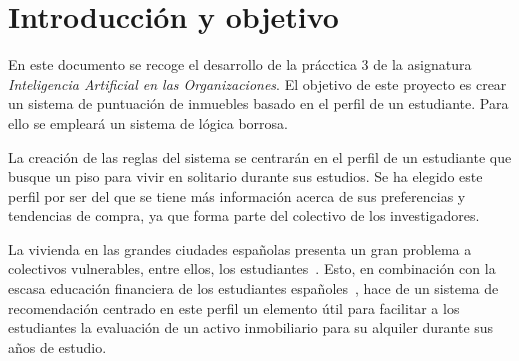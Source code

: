 \documentclass[12pt]{report} %
\begin{document}
\newpage %
\thispagestyle{empty}
\mbox{}


\tableofcontents
\thispagestyle{fancy}

\newpage %
\thispagestyle{empty}
\mbox{}

 \listoffigures
 \thispagestyle{fancy}

 \newpage %
 \thispagestyle{empty}
 \mbox{}

\listoftables
 \thispagestyle{fancy}

 \newpage %
 \thispagestyle{empty}
 \mbox{}


\clearpage
{} %

    \chapter{Introducción y objetivo}
    \label{chap:intro}

        En este documento se recoge el desarrollo de la prácctica 3 de la
        asignatura \textit{Inteligencia Artificial en las Organizaciones}. El
        objetivo de este proyecto es crear un sistema de puntuación de inmuebles 
        basado en el perfil de un estudiante. Para ello se empleará un sistema
        de lógica borrosa.

        La creación de las reglas del sistema se centrarán en el perfil de un
        estudiante que busque un piso para vivir en solitario durante sus
        estudios. Se ha elegido este perfil por ser del que se tiene más
        información acerca de sus preferencias y tendencias de compra, ya que
        forma parte del colectivo de los investigadores.

        La vivienda en las grandes ciudades españolas presenta un gran problema
        a colectivos vulnerables, entre ellos, los
        estudiantes~\cite{viviendas-precio-inaccesible}. Esto, en combinación
        con la escasa educación financiera de los estudiantes
        españoles~\cite{PISA-2022}, hace de un sistema de recomendación
        centrado en este perfil un elemento útil para facilitar a los
        estudiantes la evaluación de un activo inmobiliario para su alquiler
        durante sus años de estudio.
\end{document}
